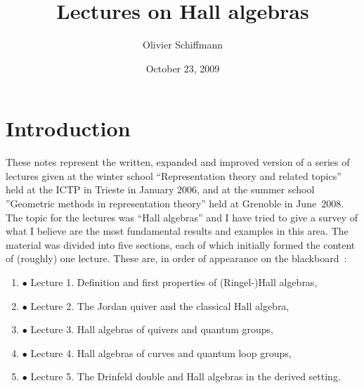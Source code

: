 \documentclass[a4paper,10pt]{amsart}
\title{Lectures on Hall algebras}
\author{Olivier Schiffmann}
\date{October 23, 2009}
\numberwithin{equation}{section}
\begin{document}
\maketitle
\tableofcontents


\section*{Introduction}

\vspace{.1in}

These notes represent the written, expanded and improved version of a series of lectures given at the winter school ``Representation theory and related topics'' held at the ICTP in Trieste in January 2006, and at the summer school ''Geometric methods in representation theory'' held at Grenoble in June~2008. The topic for the lectures was ``Hall algebras'' and I have tried to give a survey of what I believe are the most fundamental results and examples in this area. The material was divided into five sections, each of which initially formed the content of (roughly) one lecture. These are, in order of appearance on the blackboard~:

\vspace{.05in}

\begin{enumerate}
\item[]  $\bullet$ Lecture 1. Definition and first properties of (Ringel-)Hall algebras,

\vspace{.05in}

\item[] $\bullet$ Lecture 2. The Jordan quiver and the classical Hall algebra,

\vspace{.05in}

\item[] $\bullet$ Lecture 3. Hall algebras of quivers and quantum groups,

\vspace{.05in}

\item[] $\bullet$ Lecture 4. Hall algebras of curves and quantum loop groups,

\vspace{.05in}

\item[] $\bullet$ Lecture 5. The Drinfeld double and Hall algebras in the derived setting.
\end{enumerate}
\end{document}
